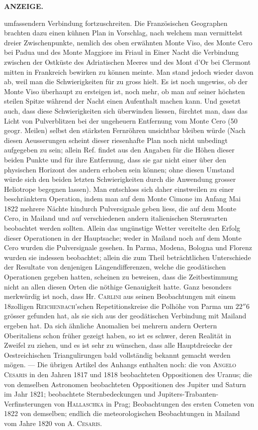 \clearpage
\thispagestyle{empty}
\noindent{}%
%
\parbox[t]{\dimexpr\linewidth-24mm\relax}{\centering\footnotesize\bfseries ANZEIGE.\par}%
\makebox[12mm][r]{}\par\medskip
\noindent umfassendern Verbindung fortzuschreiten. Die Französischen Geographen brachten dazu einen kühnen Plan in Vorschlag, nach welchem man vermittelst dreier Zwischenpunkte, nemlich des oben erwähnten Monte Viso, des Monte Cero bei Padua und des Monte Maggiore im Friaul in Einer Nacht die Verbindung zwischen der Ostküste des Adriatischen Meeres und des Mont d'Or bei Clermont mitten in Frankreich bewirken zu können meinte. Man stand jedoch wieder davon ab, weil man die Schwierigkeiten für zu gross hielt. Es ist noch ungewiss, ob der Monte Viso überhaupt zu ersteigen ist, noch mehr, ob man auf seiner höchsten steilen Spitze während der Nacht einen Aufenthalt machen kann. Und gesetzt auch, dass diese Schwierigkeiten sich überwinden liessen, fürchtet man, dass das Licht von Pulverblitzen bei der ungeheuern Entfernung vom Monte Cero (50 geogr. Meilen) selbst den stärksten Fernröhren unsichtbar bleiben würde (Nach diesen Aeusserungen scheint dieser riesenhafte Plan noch nicht unbedingt aufgegeben zu sein; allein Ref. findet aus den Angaben für die Höhen dieser beiden Punkte und für ihre Entfernung, dass sie gar nicht einer über den physischen Horizont des andern erhoben sein können; ohne diesen Umstand würde sich den beiden letzten Schwierigkeiten durch die Anwendung grosser Heliotrope begegnen lassen). Man entschloss sich daher einstweilen zu einer beschränktern Operation, indem man auf dem Monte Cimone im Anfang Mai 1822 mehrere Nächte hindurch Pulversignale geben liess, die auf dem Monte Cero, in Mailand und auf verschiedenen andern italienischen Sternwarten beobachtet werden sollten. Allein das ungünstige Wetter vereitelte den Erfolg dieser Operationen in der Hauptsache; weder in Mailand noch auf dem Monte Cero wurden die Pulversignale gesehen. In Parma, Modena, Bologna und Florenz wurden sie indessen beobachtet; allein die zum Theil beträchtlichen Unterschiede der Resultate von denjenigen Längendifferenzen, welche die geodätischen Operationen gegeben hatten, scheinen zu beweisen, dass die Zeitbestimmung nicht an allen diesen Orten die nöthige Genauigkeit hatte. Ganz besonders merkwürdig ist noch, dass Hr. \textsc{Carlini} aus seinen Beobachtungen mit einem 18zolligen \textsc{Reichenbach}'schen Repetitionskreise die Polhöhe von Parma um $22''6$ grösser gefunden hat, als sie sich aus der geodätischen Verbindung mit Mailand ergeben hat. Da sich ähnliche Anomalien bei mehrern andern Oertern Oberitaliens schon früher gezeigt haben, so ist es schwer, deren Realität in Zweifel zu ziehen, und es ist sehr zu wünschen, dass alle Hauptdreiecke der Oestreichischen Triangulirungen bald vollständig bekannt gemacht werden mögen. --- Die übrigen Artikel des Anhangs enthalten noch: die von \textsc{Angelo Cesaris} in den Jahren 1817 und 1818 beobachteten Oppositionen des Uranus; die von demselben Astronomen beobachteten Oppositionen des Jupiter und Saturn im Jahr 1821; beobachtete Sternbedeckungen und Jupiters-Trabanten-Verfinsterungen von \textsc{Hallaschka} in Prag; Beobachtungen des ersten Cometen von 1822 von demselben; endlich die meteorologischen Beobachtungen in Mailand vom Jahre 1820 von A. \textsc{Cesaris}.
